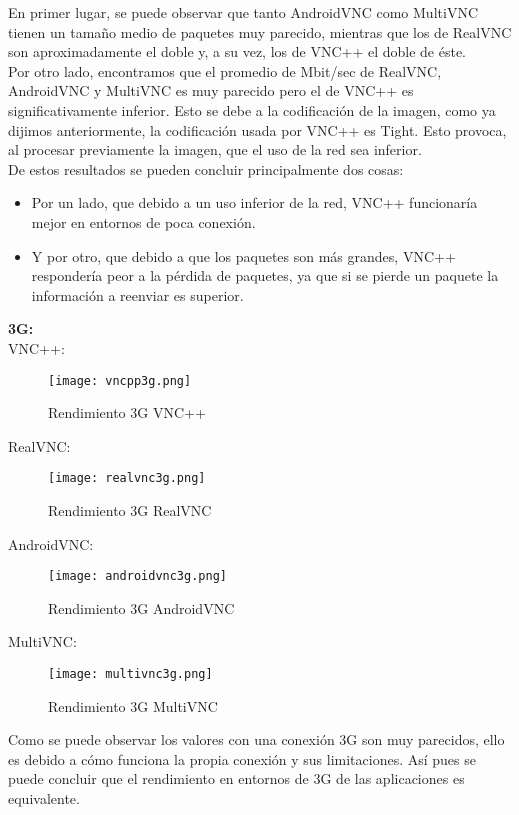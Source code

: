 En primer lugar, se puede observar que tanto AndroidVNC como MultiVNC tienen un tamaño medio de paquetes muy parecido, mientras que los de RealVNC son aproximadamente el doble y, a su vez, los de VNC++ el doble de éste.\\

Por otro lado, encontramos que el promedio de Mbit/sec de RealVNC, AndroidVNC y MultiVNC es muy parecido pero el de VNC++ es significativamente inferior. Esto se debe a la codificación de la imagen, como ya dijimos anteriormente, la codificación usada por VNC++ es Tight. Esto provoca, al procesar previamente la imagen, que el uso de la red sea inferior.\\

De estos resultados se pueden concluir principalmente dos cosas:
\begin{itemize}
\item Por un lado, que debido a un uso inferior de la red, VNC++ funcionaría mejor en entornos de poca conexión.
\item Y por otro, que debido a que los paquetes son más grandes, VNC++ respondería peor a la pérdida de paquetes, ya que si se pierde un paquete la información a reenviar es superior.
\end{itemize}
\newpage
\textbf{3G:}\\

VNC++:
\begin{figure}[h]
\begin{flushleft}
\texttt{[image: vncpp3g.png]}
\end{flushleft}
\caption{Rendimiento 3G VNC++}
\end{figure}

RealVNC:
\begin{figure}[h]
\begin{flushleft}
\texttt{[image: realvnc3g.png]}
\end{flushleft}
\caption{Rendimiento 3G RealVNC}
\end{figure}

AndroidVNC:
\begin{figure}[h]
\begin{flushleft}
\texttt{[image: androidvnc3g.png]}
\end{flushleft}
\caption{Rendimiento 3G AndroidVNC}
\end{figure}
\newpage
MultiVNC:
\begin{figure}[h]
\begin{flushleft}
\texttt{[image: multivnc3g.png]}
\end{flushleft}
\caption{Rendimiento 3G MultiVNC}
\end{figure}

Como se puede observar los valores con una conexión 3G son muy parecidos, ello es debido a cómo funciona la propia conexión y sus limitaciones. Así pues se puede concluir que el rendimiento en entornos de 3G de las aplicaciones es equivalente. 
